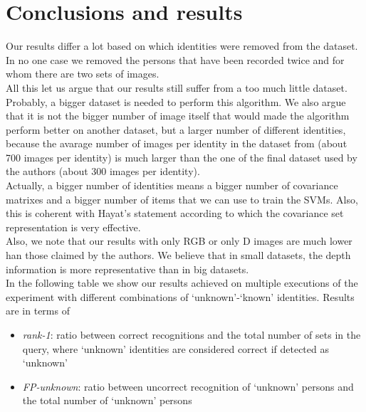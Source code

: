 \documentclass{article}
\begin{document}
\section{Conclusions and results}
Our results differ a lot based on which identities were removed from the dataset.
In no one case we removed the persons that have been recorded twice and for whom
there are two sets of images.
\\
All this let us argue that our results still suffer from a too much little
dataset. Probably, a bigger dataset is needed to perform this algorithm. We
also argue that it is not the bigger number of image itself that would made the
algorithm perform better on another dataset, but a larger number of different
identities, because the avarage number of images per identity in the dataset from
\citep{Fanelli2013} (about 700 images per identity) is much larger than the
one of the final dataset used by the authors (about 300 images per identity).
\\
Actually, a bigger number of identities means a bigger number of covariance
matrixes and a bigger number of items that we can use to train the SVMs. Also,
this is coherent with Hayat's statement according to which the covariance set
representation is very effective.
\\
Also, we note that our results with only RGB or only D images are much lower
han those claimed by the authors. We believe that in small datasets, the depth
information is more representative than in big datasets.
\\
In the following table we show our results achieved on multiple executions of
the experiment with different combinations of `unknown'-`known' identities.
Results are in terms of
\begin{itemize}
	\item \textit{rank-1}: ratio between correct recognitions and the
		total number of sets in the query, where `unknown'
		identities are considered correct if detected as `unknown'
	\item \textit{FP-unknown}: ratio between uncorrect recognition of
		`unknown' persons and the total number of `unknown' persons
\end{itemize}
\end{document}
